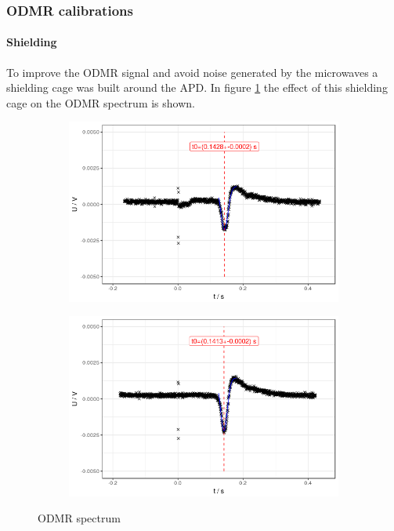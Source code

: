 \subsubsection{ODMR calibrations}
\paragraph{Shielding}
To improve the ODMR signal and avoid noise generated by the microwaves a shielding cage was built around the APD. In figure \ref{fig:odmr-shield} the effect of this shielding cage on the ODMR spectrum is shown.
\begin{figure}
	\begin{subfigure}{0.5\textwidth}
		\includegraphics[width=\textwidth]{../figures/odmr-cal-1.png}
	\end{subfigure}
	\begin{subfigure}{0.5\textwidth}	\includegraphics[width=\textwidth]{../figures/odmr-cal-2.png}
	\end{subfigure}
	\caption{ODMR spectrum}
	\label{fig:odmr-shield}
\end{figure}
